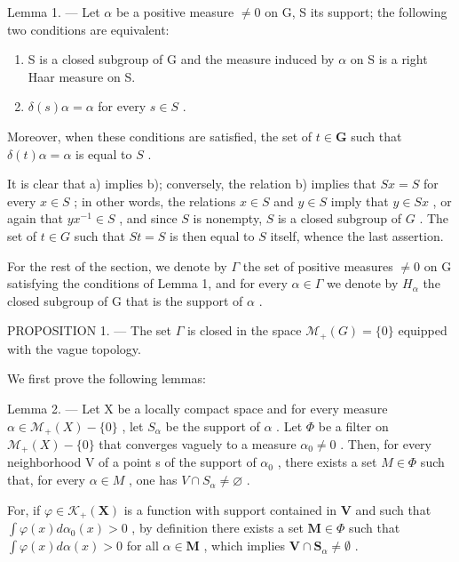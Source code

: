 Lemma 1. --- Let \(\alpha\) be a positive measure \(\neq 0\) on G, S its support; the following two conditions are equivalent:

\begin{enumerate}
\def\labelenumi{\alph{enumi})}
\item
  S is a closed subgroup of G and the measure induced by \(\alpha\) on S is a right Haar measure on S.
\item
  \(\delta(s)\alpha = \alpha\) for every \(s \in S\) .
\end{enumerate}

Moreover, when these conditions are satisfied, the set of \(t \in \mathbf{G}\) such that \(\delta(t)\alpha = \alpha\) is equal to \(S\) .

It is clear that a) implies b); conversely, the relation b) implies that \(Sx = S\) for every \(x \in S\) ; in other words, the relations \(x \in S\) and \(y \in S\) imply that \(y \in Sx\) , or again that \(yx^{-1} \in S\) , and since \(S\) is nonempty, \(S\) is a closed subgroup of \(G\) . The set of \(t \in G\) such that \(St = S\) is then equal to \(S\) itself, whence the last assertion.

For the rest of the section, we denote by \(\Gamma\) the set of positive measures \(\neq0\) on G satisfying the conditions of Lemma 1, and for every \(\alpha\in\Gamma\) we denote by \(H_{\alpha}\) the closed subgroup of G that is the support of \(\alpha\) .

PROPOSITION 1. --- The set \(\Gamma\) is closed in the space \(\mathcal{M}_{+}(G) = \{0\}\) equipped with the vague topology.

We first prove the following lemmas:

Lemma 2. --- Let X be a locally compact space and for every measure \(\alpha \in \mathcal{M}_{+}(X) - \{0\}\) , let \(S_{\alpha}\) be the support of \(\alpha\) . Let \(\Phi\) be a filter on \(\mathcal{M}_{+}(X) - \{0\}\) that converges vaguely to a measure \(\alpha_{0} \neq 0\) . Then, for every neighborhood V of a point s of the support of \(\alpha_{0}\) , there exists a set \(M \in \Phi\) such that, for every \(\alpha \in M\) , one has \(V \cap S_{\alpha} \neq \varnothing\) .

For, if \(\varphi \in \mathcal{K}_{+}(\mathbf{X})\) is a function with support contained in \(\mathbf{V}\) and such that \(\int \varphi(x)d\alpha_0(x) > 0\) , by definition there exists a set \(\mathbf{M} \in \Phi\) such that \(\int \varphi(x)d\alpha(x) > 0\) for all \(\alpha \in \mathbf{M}\) , which implies \(\mathbf{V} \cap \mathbf{S}_{\alpha} \neq \emptyset\) .

